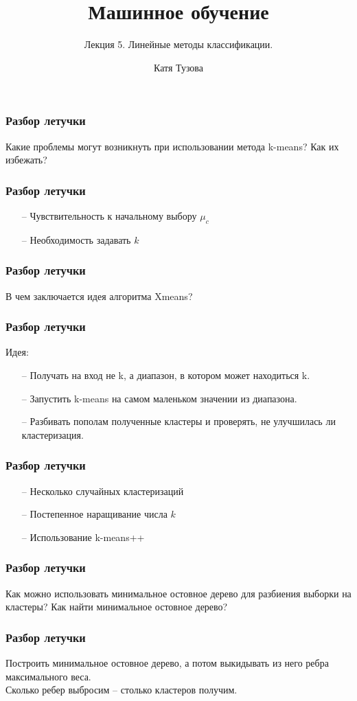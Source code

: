 \documentclass[12pt]{beamer}
\author{Катя Тузова}
\title{Машинное обучение}
\subtitle{Лекция 5. Линейные методы классификации.}
\date{}
\begin{document}
	
\frame{\titlepage}

\begin{frame}\frametitle{Разбор летучки}
Какие проблемы могут возникнуть при использовании метода k-means? Как их избежать?
\end{frame}

\begin{frame}\frametitle{Разбор летучки}
\begin{itemize}
\item[--] Чувствительность к начальному выбору $\mu_c$
\item[--] Необходимость задавать $k$
\end{itemize}
\end{frame}

\begin{frame}\frametitle{Разбор летучки}
В чем заключается идея алгоритма Xmeans?
\end{frame}

\begin{frame}\frametitle{Разбор летучки}
Идея:\\
\begin{itemize}
\item[--] Получать на вход не k, а диапазон, в котором может находиться k.
\item[--] Запустить k-means на самом маленьком значении из диапазона.
\item[--] Разбивать пополам полученные кластеры и проверять, не улучшилась ли кластеризация.
\end{itemize}
\end{frame}

\begin{frame}\frametitle{Разбор летучки}
\begin{itemize}
\item[--] Несколько случайных кластеризаций
\item[--] Постепенное наращивание числа $k$
\item[--] Использование k-means++
\end{itemize}
\end{frame}

\begin{frame}\frametitle{Разбор летучки}
Как можно использовать минимальное остовное дерево для разбиения выборки на кластеры? Как найти минимальное остовное дерево?
\end{frame}

\begin{frame}\frametitle{Разбор летучки}
Построить минимальное остовное дерево, а потом выкидывать из него ребра максимального веса.\\
\vspace{5mm}
Сколько ребер выбросим -- столько кластеров получим.
\end{frame}
\end{document}
